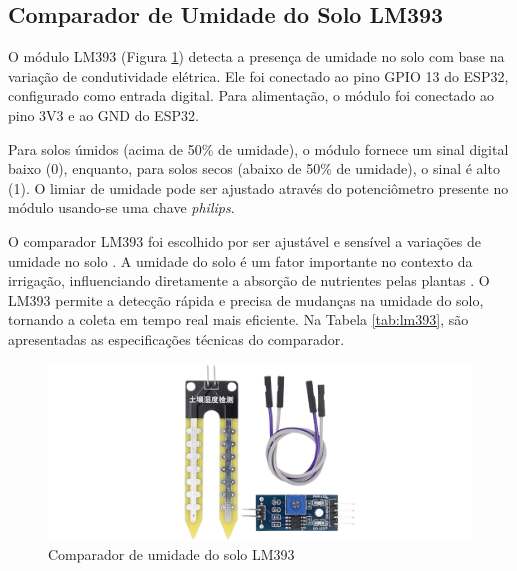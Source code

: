 \subsection{Comparador de Umidade do Solo LM393}

O módulo LM393 (Figura \ref{figura:lm393}) detecta a presença de umidade no solo com base na variação de condutividade elétrica. Ele foi conectado ao pino GPIO 13 do ESP32, configurado como entrada digital. Para alimentação, o módulo foi conectado ao pino 3V3 e ao GND do ESP32.

Para solos úmidos (acima de 50\% de umidade), o módulo fornece um sinal digital baixo (0), enquanto, para solos secos (abaixo de 50\% de umidade), o sinal é alto (1). O limiar de umidade pode ser ajustado através do potenciômetro presente no módulo usando-se uma chave \textit{philips}.

O comparador LM393 foi escolhido por ser ajustável e sensível a variações de umidade no solo \parencite{LM393}. A umidade do solo é um fator importante no contexto da irrigação, influenciando diretamente a absorção de nutrientes pelas plantas \parencite{Zhang_evapotranspiration_med2016}. O LM393 permite a detecção rápida e precisa de mudanças na umidade do solo, tornando a coleta em tempo real mais eficiente. Na Tabela \ref{tab:lm393}, são apresentadas as especificações técnicas do comparador.

\begin{figure}[!htb] \centering
  \caption{Comparador de umidade do solo LM393} \label{figura:lm393}
  \begin{varwidth}{\linewidth}
    \includegraphics[width=16cm]{figuras/LM393.png}
  \end{varwidth}
\end{figure}

